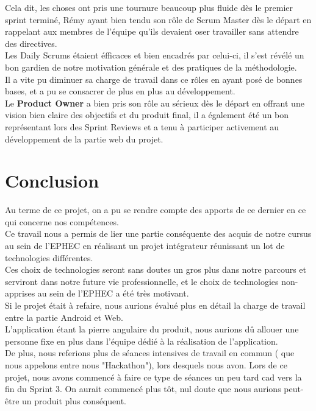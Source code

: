 \documentclass{report}
\begin{document}
		Cela dit, les choses ont pris une tournure beaucoup plus fluide dès le premier sprint terminé, Rémy ayant bien tendu son rôle de Scrum Master dès le départ en rappelant aux membres de l'équipe qu'ils devaient oser travailler sans attendre des directives.\\
		Les Daily Scrums étaient éfficaces et bien encadrés par celui-ci, il s'est révélé un bon gardien de notre motivation générale et des pratiques de la méthodologie.\\
		Il a vite pu diminuer sa charge de travail dans ce rôles en ayant posé de bonnes bases, et a pu se consacrer de plus en plus au développement.\\

		Le \textbf{Product Owner} a bien pris son rôle au sérieux dès le départ en offrant une vision bien claire des objectifs et du produit final, il a également été un bon représentant lors des Sprint Reviews et a tenu à participer activement au développement de la partie web du projet.\\

\chapter{Conclusion}
	 
	Au terme de ce projet, on a pu se rendre compte des apports de ce dernier en ce qui concerne nos compétences.\\
	Ce travail nous a permis de lier une partie conséquente des acquis de notre cursus au sein de l'EPHEC en réalisant un projet intégrateur réunissant un lot de technologies différentes.\\
	Ces choix de technologies seront sans doutes un gros plus dans notre parcours et serviront dans notre future vie professionnelle, et le choix de technologies non-apprises au sein de l'EPHEC a été très motivant.\\

	Si le projet était à refaire, nous aurions évalué plus en détail la charge de travail entre la partie Android et Web.\\
	L'application étant la pierre angulaire du produit, nous aurions dû allouer une personne fixe en plus dans l'équipe dédié à la réalisation de l'application.\\
	De plus, nous referions plus de séances intensives de travail en commun ( que nous appelons entre nous "Hackathon"), lors desquels nous avon. Lors de ce projet, nous avons commencé à faire ce type  de séances un peu tard cad vers la fin du Sprint 3. On aurait commencé plus tôt, nul doute que nous aurions peut-être un produit plus conséquent.\\
\end{document}
